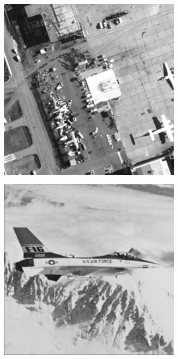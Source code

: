 \begin{figure}
    \centering
    \begin{subfigure}[b]{0.09\textwidth}
        \centering
        \includegraphics[width=1\textwidth]{images/pgpd/airfield.png}
    \end{subfigure}
    \hfill
    \begin{subfigure}[b]{0.09\textwidth}
        \centering
        \includegraphics[width=1\textwidth]{images/pgpd/airplane.png}

\end{subfigure}
\end{figure}
